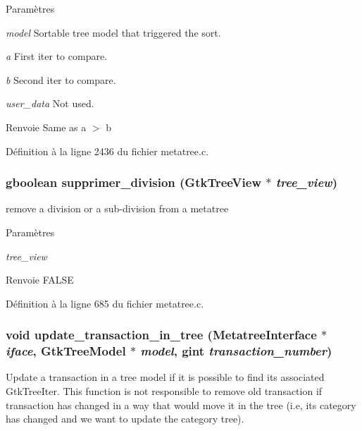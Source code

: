 \begin{DoxyParams}{Paramètres}
\item[{\em model}]Sortable tree model that triggered the sort. \item[{\em a}]First iter to compare. \item[{\em b}]Second iter to compare. \item[{\em user\_\-data}]Not used.\end{DoxyParams}
\begin{DoxyReturn}{Renvoie}
Same as a $>$ b 
\end{DoxyReturn}


Définition à la ligne 2436 du fichier metatree.c.

\subsubsection[{supprimer\_\-division}]{\setlength{\rightskip}{0pt plus 5cm}gboolean supprimer\_\-division (GtkTreeView $\ast$ {\em tree\_\-view})}\label{metatree_8c_a60d43ade0aa1dad68c8b3d87c5200dd1}
remove a division or a sub-\/division from a metatree


\begin{DoxyParams}{Paramètres}
\item[{\em tree\_\-view}]\end{DoxyParams}
\begin{DoxyReturn}{Renvoie}
FALSE 
\end{DoxyReturn}


Définition à la ligne 685 du fichier metatree.c.

\subsubsection[{update\_\-transaction\_\-in\_\-tree}]{\setlength{\rightskip}{0pt plus 5cm}void update\_\-transaction\_\-in\_\-tree ({\bf MetatreeInterface} $\ast$ {\em iface}, \/  GtkTreeModel $\ast$ {\em model}, \/  gint {\em transaction\_\-number})}\label{metatree_8c_afd46b955f542c4091bce75608dcc8504}
Update a transaction in a tree model if it is possible to find its associated GtkTreeIter. This function is not responsible to remove old transaction if transaction has changed in a way that would move it in the tree (i.e, its category has changed and we want to update the category tree).



